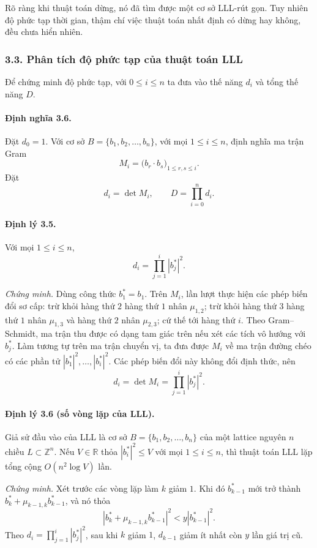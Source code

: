\documentclass[11pt]{article}
\begin{document}
Rõ ràng khi thuật toán dừng, nó đã tìm được một cơ sở LLL-rút gọn. Tuy nhiên
độ phức tạp thời gian, thậm chí việc thuật toán nhất định có dừng hay không,
đều chưa hiển nhiên.

\subsubsection*{3.3. Phân tích độ phức tạp của thuật toán LLL}

Để chứng minh độ phức tạp, với \(0\le i\le n\) ta đưa vào thế năng \(d_i\) và
tổng thế năng \(D\).

\paragraph{Định nghĩa 3.6.}
Đặt \(d_0=1\). Với cơ sở \(B=\{b_1,b_2,\ldots,b_n\}\), với mọi
\(1\le i\le n\), định nghĩa ma trận Gram
\[
  M_i=\bigl(b_r\cdot b_s\bigr)_{1\le r,s\le i}.
\]
Đặt
\[
  d_i=\det M_i,\qquad D=\prod_{i=0}^{n}d_i.
\]

\paragraph{Định lý 3.5.}
Với mọi \(1\le i\le n\),
\[
  d_i=\prod_{j=1}^{i}|b_j^*|^2.
\]

\emph{Chứng minh.}
Dùng công thức \(b_1^*=b_1\). Trên \(M_i\), lần lượt thực hiện các phép biến
đổi sơ cấp: trừ khỏi hàng thứ \(2\) hàng thứ \(1\) nhân \(\mu_{1,2}\); trừ
khỏi hàng thứ \(3\) hàng thứ \(1\) nhân \(\mu_{1,3}\) và hàng thứ \(2\) nhân
\(\mu_{2,3}\); cứ thế tới hàng thứ \(i\). Theo Gram--Schmidt, ma trận thu được
có dạng tam giác trên nếu xét các tích vô hướng với \(b_j^*\). Làm tương tự
trên ma trận chuyển vị, ta đưa được \(M_i\) về ma trận đường chéo có các phần
tử \(|b_1^*|^2,\ldots,|b_i^*|^2\). Các phép biến đổi này không đổi định thức,
nên
\[
  d_i=\det M_i=\prod_{j=1}^{i}|b_j^*|^2.
\]

\paragraph{Định lý 3.6 (số vòng lặp của LLL).}
Giả sử đầu vào của LLL là cơ sở \(B=\{b_1,b_2,\ldots,b_n\}\) của một lattice
nguyên \(n\) chiều \(L\subset\mathbb Z^n\). Nếu \(V\in\mathbb R\) thỏa
\(|b_i^*|^2\le V\) với mọi \(1\le i\le n\), thì thuật toán LLL lặp tổng cộng
\(O(n^2\log V)\) lần.

\emph{Chứng minh.}
Xét trước các vòng lặp làm \(k\) giảm \(1\). Khi đó \(b_{k-1}^*\) mới trở
thành \(b_k^*+\mu_{k-1,k}b_{k-1}^*\), và nó thỏa
\[
  |b_k^*+\mu_{k-1,k}b_{k-1}^*|^2<y|b_{k-1}^*|^2.
\]
Theo \(d_i=\prod_{j=1}^{i}|b_j^*|^2\), sau khi \(k\) giảm \(1\), \(d_{k-1}\)
giảm ít nhất còn \(y\) lần giá trị cũ.
\end{document}

